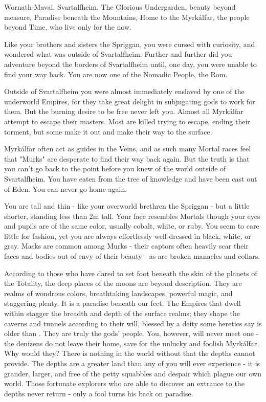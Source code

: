 {  Wornath-Mavai. Svartalfheim. The Glorious Undergarden, beauty beyond measure, Paradise beneath the Mountains, Home to the Myrkálfar, the people beyond Time, who live only for the now.

  Like your brothers and sisters the Spriggan, you were cursed with curiosity, and wondered what was outside of Svartalfheim.  Further and further did you adventure beyond the borders of Svartalfheim until, one day, you were unable to find your way back.  You are now one of the Nomadic People, the Rom.

  Outside of Svartalfheim you were almost immediately enslaved by one of the underworld Empires, for they take great delight in subjugating gods to work for them.  But the burning desire to be free never left you. Almost all Myrkálfar attempt to escape their masters.  Most are killed trying to escape, ending their torment, but some make it out and make their way to the surface.  

  Myrkálfar often act as guides in the Veins, and as such many Mortal races feel that "Murks" are desperate to find their way back again. But the truth is that you can't go back to the point before you knew of the world outside of Svartalfheim.  You have eaten from the tree of knowledge and have been cast out of Eden.  You can never go home again.

  You are tall and thin - like your overworld brethren the Spriggan - but a little shorter, standing less than 2m tall.  Your face resembles Mortals though your eyes and pupils are of the same color,  usually cobalt, white, or ruby.  You seem to care little for fashion, yet you are always effortlessly well-dressed in black, white, or gray.  Masks are common among Murks - their captors often heavily scar their faces and bodies out of envy of their beauty - as are broken manacles and collars.





  According to those who have dared to set foot beneath the skin of the planets of the Totality, the deep places of the moons are beyond description.  They are realms of wondrous colors, breathtaking landscapes, powerful magic, and staggering plenty.  It is a paradise beneath our feet.  The Empires that dwell within stagger the breadth and depth of the surface realms; they shape the caverns and tunnels according to their will, blessed by a deity some heretics say is older than \TheAuthority.  They are truly the gods' people.  You, however, will never meet one - the denizens do not leave their home, save for the unlucky and foolish Myrkálfar.  Why would they?  There is nothing in the world without that the depths cannot provide.  The depths are a greater land than any of you will ever experience - it is grander, larger, and free of the petty squabbles and despair which plague our own world.  Those fortunate explorers who are able to discover an extrance to the depths never return - only a fool turns his back on paradise.\footnotemark[\value{footnote}]

}
